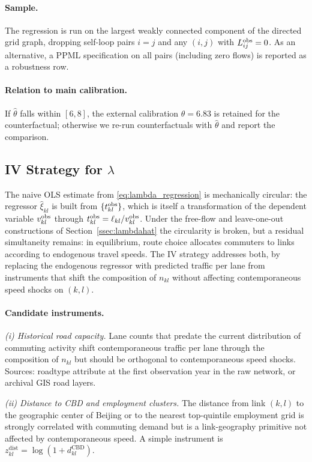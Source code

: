 \paragraph{Sample.}
The regression is run on the largest weakly connected component of
the directed grid graph, dropping self-loop pairs $i=j$ and any
$(i,j)$ with $L_{ij}^{\mathrm{obs}}=0$.  As an alternative, a PPML
specification on all pairs (including zero flows) is reported as a
robustness row.

\paragraph{Relation to main calibration.}
If $\hat\theta$ falls within $[6,8]$, the external calibration
$\theta=6.83$ is retained for the counterfactual; otherwise we
re-run counterfactuals with $\hat\theta$ and report the comparison.

\subsection{IV Strategy for $\lambda$}\label{app:iv}

The naive OLS estimate from \eqref{eq:lambda_regression} is
mechanically circular: the regressor $\hat\xi_{kl}$ is built from
$\{t_{kl}^{\mathrm{obs}}\}$, which is itself a transformation of the
dependent variable $v_{kl}^{\mathrm{obs}}$ through
$t_{kl}^{\mathrm{obs}}=\ell_{kl}/v_{kl}^{\mathrm{obs}}$.  Under the free-flow and
leave-one-out constructions of Section~\ref{ssec:lambdahat} the
circularity is broken, but a residual simultaneity remains: in
equilibrium, route choice allocates commuters to links according to
endogenous travel speeds.  The IV strategy addresses both, by
replacing the endogenous regressor with predicted traffic per lane
from instruments that shift the composition of $n_{kl}$ without
affecting contemporaneous speed shocks on $(k,l)$.

\paragraph{Candidate instruments.}

\emph{(i) Historical road capacity.}  Lane counts that predate the
current distribution of commuting activity shift contemporaneous
traffic per lane through the composition of $n_{kl}$ but should be
orthogonal to contemporaneous speed shocks.  Sources: roadtype
attribute at the first observation year in the raw network, or
archival GIS road layers.

\emph{(ii) Distance to CBD and employment clusters.}  The distance
from link $(k,l)$ to the geographic center of Beijing or to the
nearest top-quintile employment grid is strongly correlated with
commuting demand but is a link-geography primitive not affected by
contemporaneous speed.  A simple instrument is
$z^{\mathrm{dist}}_{kl}=\log(1+d_{kl}^{\mathrm{CBD}})$.

